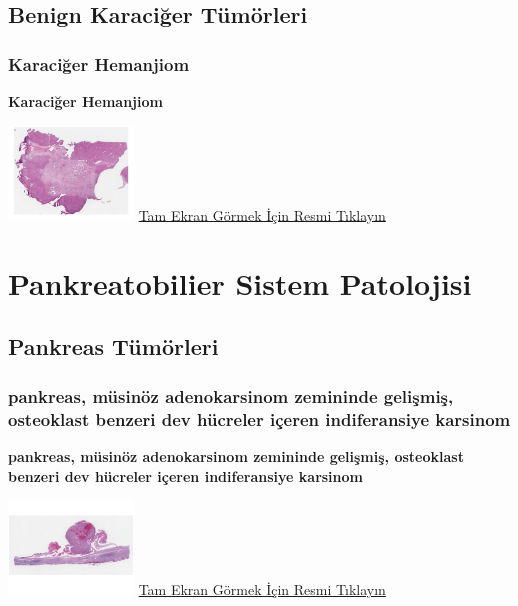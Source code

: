 \documentclass[
  letterpaper,
  DIV=11,
  numbers=noendperiod]{scrreprt}
\begin{document}
\hypertarget{sec-benign-karaciger-tumorleri}{%
\chapter{Benign Karaciğer
Tümörleri}\label{sec-benign-karaciger-tumorleri}}

\hypertarget{sec-karaciger-hemanjiom}{%
\section{Karaciğer Hemanjiom}\label{sec-karaciger-hemanjiom}}

\textbf{Karaciğer Hemanjiom}

\href{https://images.patolojiatlasi.com/liver-hemangioma/HE.html}{\includegraphics[width=0.25\textwidth,height=\textheight]{./screenshots/thumbnail_liver-hemangioma.png}}
\href{https://images.patolojiatlasi.com/liver-hemangioma/HE.html}{Tam
Ekran Görmek İçin Resmi Tıklayın}

\part{Pankreatobilier Sistem Patolojisi}

\hypertarget{sec-pankreas-tumorleri}{%
\chapter{Pankreas Tümörleri}\label{sec-pankreas-tumorleri}}

\hypertarget{sec-pankreas-musinous-adenokarsinom-osteoklast}{%
\section{pankreas, müsinöz adenokarsinom zemininde gelişmiş, osteoklast
benzeri dev hücreler içeren indiferansiye
karsinom}\label{sec-pankreas-musinous-adenokarsinom-osteoklast}}

\textbf{pankreas, müsinöz adenokarsinom zemininde gelişmiş, osteoklast
benzeri dev hücreler içeren indiferansiye karsinom}

\href{https://images.patolojiatlasi.com/pancreas-undifferentiated-osteoclast/HE.html}{\includegraphics[width=0.25\textwidth,height=\textheight]{./screenshots/thumbnail_pancreas-undifferentiated-osteoclast.png}}
\href{https://images.patolojiatlasi.com/pancreas-undifferentiated-osteoclast/HE.html}{Tam
Ekran Görmek İçin Resmi Tıklayın}
\end{document}
